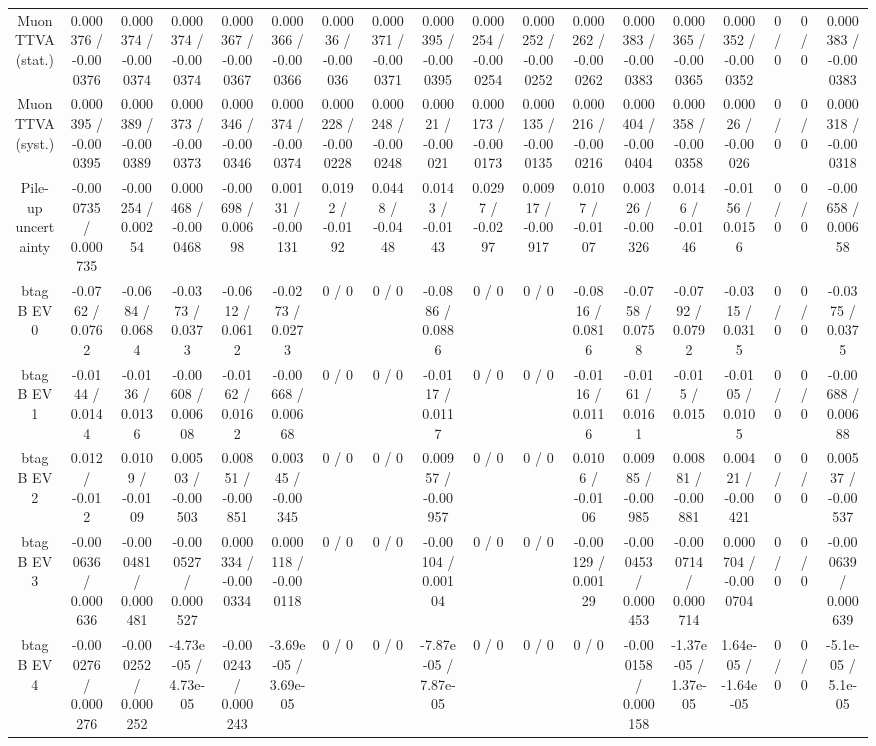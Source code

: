 \documentclass[10pt]{article}
\begin{document}
\begin{table}[htbp]
\begin{center}
\begin{tabular}{|c|c|c|c|c|c|c|c|c|c|c|c|c|c|c|c|c|c|}
  Muon TTVA (stat.) & 0.000376 / -0.000376 & 0.000374 / -0.000374 & 0.000374 / -0.000374 & 0.000367 / -0.000367 & 0.000366 / -0.000366 & 0.00036 / -0.00036 & 0.000371 / -0.000371 & 0.000395 / -0.000395 & 0.000254 / -0.000254 & 0.000252 / -0.000252 & 0.000262 / -0.000262 & 0.000383 / -0.000383 & 0.000365 / -0.000365 & 0.000352 / -0.000352 & 0 / 0 & 0 / 0 & 0.000383 / -0.000383 \\ 
  Muon TTVA (syst.) & 0.000395 / -0.000395 & 0.000389 / -0.000389 & 0.000373 / -0.000373 & 0.000346 / -0.000346 & 0.000374 / -0.000374 & 0.000228 / -0.000228 & 0.000248 / -0.000248 & 0.00021 / -0.00021 & 0.000173 / -0.000173 & 0.000135 / -0.000135 & 0.000216 / -0.000216 & 0.000404 / -0.000404 & 0.000358 / -0.000358 & 0.00026 / -0.00026 & 0 / 0 & 0 / 0 & 0.000318 / -0.000318 \\ 
  Pile-up uncertainty & -0.000735 / 0.000735 & -0.00254 / 0.00254 & 0.000468 / -0.000468 & -0.00698 / 0.00698 & 0.00131 / -0.00131 & 0.0192 / -0.0192 & 0.0448 / -0.0448 & 0.0143 / -0.0143 & 0.0297 / -0.0297 & 0.00917 / -0.00917 & 0.0107 / -0.0107 & 0.00326 / -0.00326 & 0.0146 / -0.0146 & -0.0156 / 0.0156 & 0 / 0 & 0 / 0 & -0.00658 / 0.00658 \\ 
  btag B EV 0 & -0.0762 / 0.0762 & -0.0684 / 0.0684 & -0.0373 / 0.0373 & -0.0612 / 0.0612 & -0.0273 / 0.0273 & 0 / 0 & 0 / 0 & -0.0886 / 0.0886 & 0 / 0 & 0 / 0 & -0.0816 / 0.0816 & -0.0758 / 0.0758 & -0.0792 / 0.0792 & -0.0315 / 0.0315 & 0 / 0 & 0 / 0 & -0.0375 / 0.0375 \\ 
  btag B EV 1 & -0.0144 / 0.0144 & -0.0136 / 0.0136 & -0.00608 / 0.00608 & -0.0162 / 0.0162 & -0.00668 / 0.00668 & 0 / 0 & 0 / 0 & -0.0117 / 0.0117 & 0 / 0 & 0 / 0 & -0.0116 / 0.0116 & -0.0161 / 0.0161 & -0.015 / 0.015 & -0.0105 / 0.0105 & 0 / 0 & 0 / 0 & -0.00688 / 0.00688 \\ 
  btag B EV 2 & 0.012 / -0.012 & 0.0109 / -0.0109 & 0.00503 / -0.00503 & 0.00851 / -0.00851 & 0.00345 / -0.00345 & 0 / 0 & 0 / 0 & 0.00957 / -0.00957 & 0 / 0 & 0 / 0 & 0.0106 / -0.0106 & 0.00985 / -0.00985 & 0.00881 / -0.00881 & 0.00421 / -0.00421 & 0 / 0 & 0 / 0 & 0.00537 / -0.00537 \\ 
  btag B EV 3 & -0.000636 / 0.000636 & -0.000481 / 0.000481 & -0.000527 / 0.000527 & 0.000334 / -0.000334 & 0.000118 / -0.000118 & 0 / 0 & 0 / 0 & -0.00104 / 0.00104 & 0 / 0 & 0 / 0 & -0.00129 / 0.00129 & -0.000453 / 0.000453 & -0.000714 / 0.000714 & 0.000704 / -0.000704 & 0 / 0 & 0 / 0 & -0.000639 / 0.000639 \\ 
  btag B EV 4 & -0.000276 / 0.000276 & -0.000252 / 0.000252 & -4.73e-05 / 4.73e-05 & -0.000243 / 0.000243 & -3.69e-05 / 3.69e-05 & 0 / 0 & 0 / 0 & -7.87e-05 / 7.87e-05 & 0 / 0 & 0 / 0 & 0 / 0 & -0.000158 / 0.000158 & -1.37e-05 / 1.37e-05 & 1.64e-05 / -1.64e-05 & 0 / 0 & 0 / 0 & -5.1e-05 / 5.1e-05 \\ 

\end{tabular}
\end{center}
\end{table}
\end{document}
